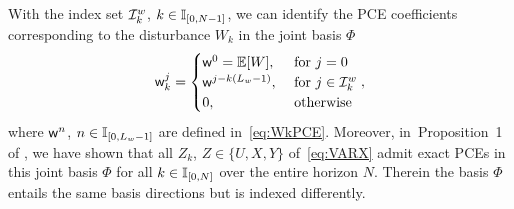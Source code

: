 With the index set $\mathcal{I}_{k}^w$,  $k\in\mathbb{I}_{[0,N-1]}$, we can identify the PCE coefficients corresponding to the disturbance $W_k$ in the joint basis $\Phi$
\begin{equation*}
	\mathsf{w}_k^j = \begin{cases}
		\mathsf{w}^0=\mathbb{E}[W],~&\text{for } j=0\\
		\mathsf{w}^{j-k(L_w-1)},~&\text{for } j\in\mathcal{I}_{k}^w\\
		0,&\text{otherwise}
	\end{cases},
\end{equation*}
where $\mathsf{w}^{n}$, $n\in\mathbb{I}_{[0,L_w-1]}$ are defined in~\eqref{eq:WkPCE}. Moreover, in~Proposition~1 of \citet{pan23stochastic}, we have shown that all $Z_k$, $Z\in\{U,X,Y\}$ of~\eqref{eq:VARX} admit exact PCEs in this joint basis $\Phi$ for all $k \in \mathbb{I}_{[0,N]}$ over the entire horizon $N$. Therein the basis $\Phi$ entails the same basis directions but is indexed differently.

